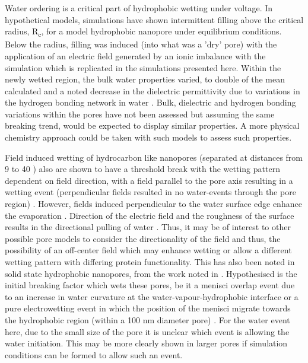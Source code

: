 Water ordering is a critical part of hydrophobic wetting under voltage. In hypothetical models, simulations have shown intermittent filling above the critical radius, R\textsubscript{c}, for a model hydrophobic nanopore under equilibrium conditions. Below the radius, filling was induced (into what was a 'dry' pore) with the application of an electric field generated by an ionic imbalance with the simulation which is replicated in the simulations presented here. Within the newly wetted region, the bulk water properties varied, to double of the mean calculated and a noted decrease in the dielectric permittivity due to variations in the hydrogen bonding network in water \cite{Dzubiella2005}. Bulk, dielectric and hydrogen bonding variations within the pores have not been assessed but assuming the same breaking trend, would be expected to display similar properties. A more physical chemistry approach could be taken with such models to assess such properties.

Field induced wetting of hydrocarbon like nanopores (separated at distances from 9 to 40 \angstrom) also are shown to have a threshold break with the wetting pattern dependent on field direction, with a field parallel to the pore axis resulting in a wetting event (perpendicular fields resulted in no water-events through the pore region) \cite{Bratko2007}.  However, fields induced perpendicular to the water surface edge enhance the evaporation \cite{Okuno2009}. Direction of the electric field and the roughness of the surface results in the directional pulling of water \cite{Yen2012a}. Thus, it may be of interest to other possible pore models to consider the directionality of the field and thus, the possibility of an off-center field which may enhance wetting or allow a different wetting pattern with differing protein functionality. This has also been noted in solid state hydrophobic nanopores, from the work noted in \cite{Smirnov2011a}. Hypothesised is the initial breaking factor which wets these pores, be it a menisci overlap event due to an increase in water curvature at the water-vapour-hydrophobic interface or a pure electrowetting event in which the position of the menisci migrate towards the hydrophobic region (within a 100 nm diameter pore) \cite{Smirnov2011}. For the water event here, due to the small size of the pore it is unclear which event is allowing the water initiation. This may be more clearly shown in larger pores if simulation conditions can be formed to allow such an event. 

